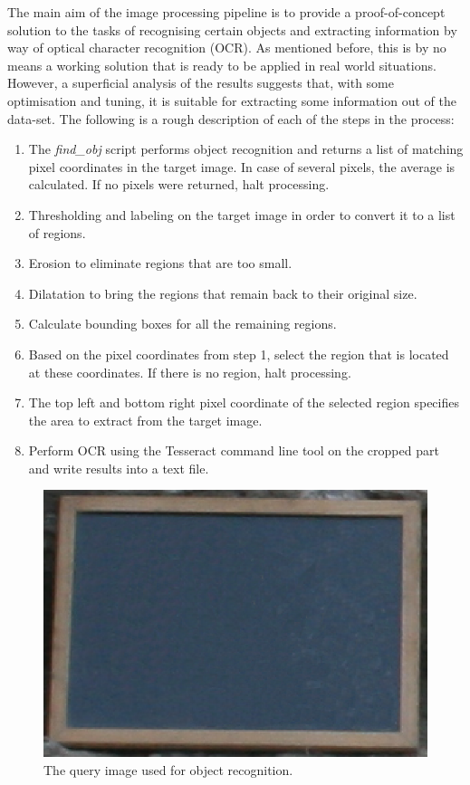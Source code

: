 \documentclass [12pt,a4paper]{report}
\begin{document}
The main aim of the image processing pipeline is to provide a proof-of-concept solution to the tasks of recognising certain objects and extracting information by way of optical character recognition (OCR). As mentioned before, this is by no means a working solution that is ready to be applied in real world situations. However, a superficial analysis of the results suggests that, with some optimisation and tuning, it is suitable for extracting some information out of the data-set. The following is a rough description of each of the steps in the process:
\begin{enumerate}
\item The \textit{find\_obj} script performs object recognition and returns a list of matching pixel coordinates in the target image. In case of several pixels, the average is calculated. If no pixels were returned, halt processing.
\item Thresholding and labeling on the target image in order to convert it to a list of regions.
\item Erosion to eliminate regions that are too small.
\item Dilatation to bring the regions that remain back to their original size.
\item Calculate bounding boxes for all the remaining regions.
\item Based on the pixel coordinates from step 1, select the region that is located at these coordinates. If there is no region, halt processing.
\item The top left and bottom right pixel coordinate of the selected region specifies the area to extract from the target image.
\item Perform OCR using the Tesseract command line tool on the cropped part and write results into a text file.
\end{enumerate}

\begin{center}
\begin{figure}[h]
\centering
\includegraphics[scale=0.3]{box.eps} %
\caption{The query image used for object recognition.}
\label{box}
\end{figure}
\end{center}
\end{document}
